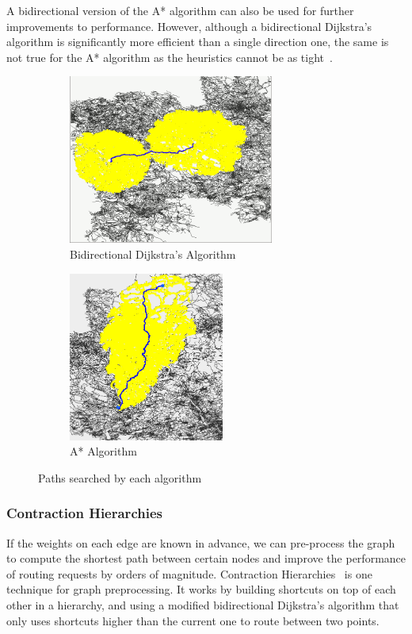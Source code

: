 \documentclass[ %
                    author={Alexander Hill},
                supervisor={Dr. Benjamin Sach},
                    degree={MEng},
                     title={MARMOSET},
                  subtitle={Multi-Agent Route Management using Online Simulation for Efficient Transportation},
                      type={research},
                      year={2016} ]{dissertation}
\begin{document}
A bidirectional version of the A* algorithm can also be used for further
improvements to performance. However, although a bidirectional Dijkstra's
algorithm is significantly more efficient than a single direction one, the same
is not true for the A* algorithm as the heuristics cannot be as
tight~\cite{astar-bi}.

\begin{figure}[h]
\centering
\begin{subfigure}[b]{0.4\textwidth}
    \centering
    \includegraphics[height=15em]{bidijkstra-city}
    \caption{Bidirectional Dijkstra's Algorithm}\label{fig:bidijkstra}
\end{subfigure}
\hspace{2em}
\begin{subfigure}[b]{0.4\textwidth}
    \centering
    \includegraphics[height=15em]{astar-city}
    \caption{A* Algorithm}\label{fig:astar}
\end{subfigure}
\caption{Paths searched by each algorithm}
\end{figure}

\subsubsection{Contraction Hierarchies}

If the weights on each edge are known in advance, we can pre-process the graph to
compute the shortest path between certain nodes and improve the
performance of routing requests by orders of magnitude. Contraction
Hierarchies~\cite{ch} is one technique for graph preprocessing.  It works by
building shortcuts on top of each other in a hierarchy, and using a modified
bidirectional Dijkstra's algorithm that only uses shortcuts higher than the
current one to route between two points.
\end{document}
